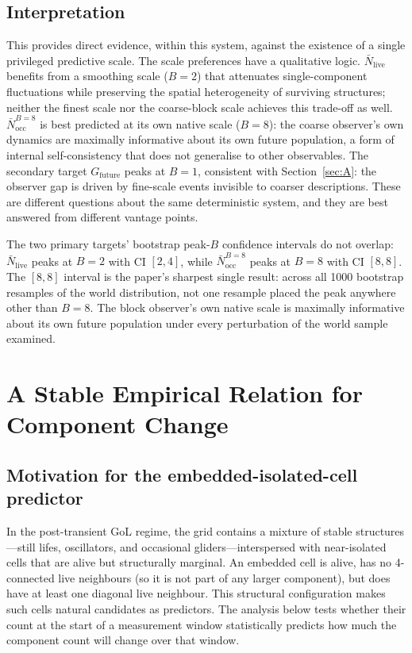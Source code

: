 \documentclass[aip,cha,preprint,nofootinbib]{revtex4-2}
\newcommand{\Nlive}{\bar{N}_{\mathrm{live}}}
\newcommand{\Nocc}{\bar{N}^{B=8}_{\mathrm{occ}}}
\newcommand{\Gfut}{G_{\mathrm{future}}}
\begin{document}
\subsection{Interpretation}

This provides direct evidence, within this system, against the existence of
a single privileged predictive scale.
The scale preferences have a qualitative logic.
$\Nlive$ benefits from a smoothing scale ($B=2$) that attenuates
single-component fluctuations while preserving the spatial heterogeneity of
surviving structures; neither the finest scale nor the coarse-block scale
achieves this trade-off as well.
$\Nocc$ is best predicted at its own native scale ($B=8$): the coarse
observer's own dynamics are maximally informative about its own future
population, a form of internal self-consistency that does not generalise to
other observables.
The secondary target $\Gfut$ peaks at $B=1$, consistent with
Section~\ref{sec:A}: the observer gap is driven by fine-scale events
invisible to coarser descriptions.
These are different questions about the same deterministic system, and they
are best answered from different vantage points.

The two primary targets' bootstrap peak-$B$ confidence intervals do not
overlap: $\Nlive$ peaks at $B=2$ with CI $[2,4]$, while $\Nocc$ peaks at
$B=8$ with CI $[8,8]$.
The $[8,8]$ interval is the paper's sharpest single result: across all
1000 bootstrap resamples of the world distribution, not one resample placed
the peak anywhere other than $B=8$.
The block observer's own native scale is maximally informative about its own
future population under every perturbation of the world sample examined.

\section{A Stable Empirical Relation for Component Change}
\label{sec:D}

\subsection{Motivation for the embedded-isolated-cell predictor}

In the post-transient GoL regime, the grid contains a mixture of stable
structures---still lifes, oscillators, and occasional gliders---interspersed
with near-isolated cells that are alive but structurally marginal.
An embedded cell is alive, has no 4-connected live neighbours (so it is not
part of any larger component), but does have at least one diagonal live
neighbour.
This structural configuration makes such cells natural candidates as
predictors.
The analysis below tests whether their count at the start of a measurement
window statistically predicts how much the component count will change over
that window.
\end{document}
